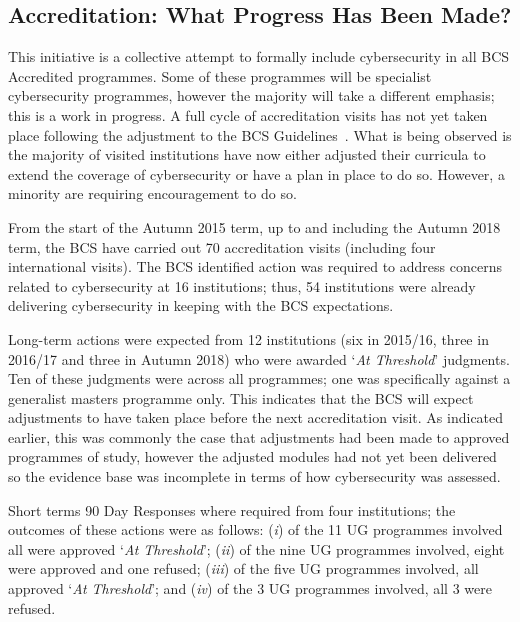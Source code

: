\documentclass[conference]{IEEEtran}
\begin{document}
{\subsection{Accreditation: What Progress Has Been Made?}

This initiative is a collective attempt to formally include cybersecurity in all BCS Accredited programmes. Some of these programmes will be specialist cybersecurity programmes, however the majority will take a different emphasis; this is a work in progress. A full cycle of accreditation visits has not yet taken place following the adjustment to the BCS Guidelines~\cite{BCS2018b}. What is being observed is the majority of visited institutions have now either adjusted their curricula to extend the coverage of cybersecurity or have a plan in place to do so. However, a minority are requiring encouragement to do so.

From the start of the Autumn 2015 term, up to and including the Autumn 2018 term, the BCS have carried out 70 accreditation visits (including four international visits). The BCS identified action was required to address concerns related to cybersecurity at 16 institutions; thus, 54 institutions were already delivering cybersecurity in keeping with the BCS expectations.

Long-term actions were expected from 12 institutions (six in 2015/16, three in 2016/17 and three in Autumn 2018) who were awarded `{\emph{At Threshold}}' judgments. Ten of these judgments were across all programmes; one was specifically against a generalist masters programme only. This indicates that the BCS will expect adjustments to have taken place before the next accreditation visit. As indicated earlier, this was commonly the case that adjustments had been made to approved programmes of study, however the adjusted modules had not yet been delivered so the evidence base was incomplete in terms of how cybersecurity was assessed.
 
Short terms 90 Day Responses where required from four institutions; the outcomes of these actions were as follows: ({\emph{i}}) of the 11 UG programmes involved all were approved `{\emph{At Threshold}}'; ({\emph{ii}}) of the nine UG programmes involved, eight were approved and one refused; ({\emph{iii}}) of the five UG programmes involved, all approved `{\emph{At Threshold}}'; and ({\emph{iv}}) of the 3 UG programmes involved, all 3 were refused.

 
}
\end{document}
